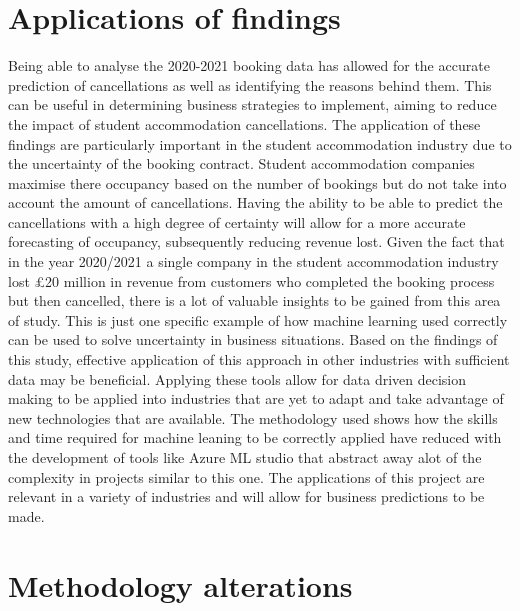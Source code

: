 \section{Applications of findings}

Being able to analyse the 2020-2021 booking data has allowed for the accurate prediction of cancellations as well as identifying the reasons behind them. This can be useful in determining business strategies to implement, aiming to reduce the impact of student accommodation cancellations. The application of these findings are particularly important in the student accommodation industry due to the uncertainty of the booking contract. Student accommodation companies maximise there occupancy based on the number of bookings but do not take into account the amount of cancellations. Having the ability to be able to predict the cancellations with a high degree of certainty will allow for a more accurate forecasting of occupancy, subsequently reducing revenue lost. 
\vspace{5mm}
Given the fact that in the year 2020/2021 a single company in the student accommodation industry lost £20 million in revenue from customers who completed the booking process but then cancelled, there is a lot of valuable insights to be gained from this area of study. This is just one specific example of how machine learning used correctly can be used to solve uncertainty in business situations. Based on the findings of this study, effective application of this approach in other industries with sufficient data may be beneficial. Applying these tools allow for data driven decision making to be applied into industries that are yet to adapt and take advantage of new technologies that are available. The methodology used shows how the skills and time required for machine leaning to be correctly applied have reduced with the development of tools like Azure ML studio that abstract away alot of the complexity in projects similar to this one. The applications of this project are relevant in a variety of industries and will allow for business predictions to be made.

\section{Methodology alterations}
 
